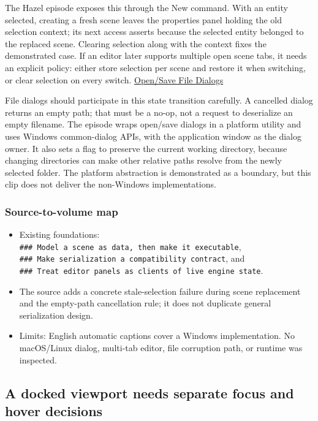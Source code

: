 The Hazel episode exposes this through the New command. With an entity selected, creating a fresh scene leaves the properties panel holding the old selection context; its next access asserts because the selected entity belonged to the replaced scene. Clearing selection along with the context fixes the demonstrated case. If an editor later supports multiple open scene tabs, it needs an explicit policy: either store selection per scene and restore it when switching, or clear selection on every switch. \href{https://www.youtube.com/watch?v=zn7N7zHgCcs}{Open/Save File Dialogs}

File dialogs should participate in this state transition carefully. A cancelled dialog returns an empty path; that must be a no-op, not a request to deserialize an empty filename. The episode wraps open/save dialogs in a platform utility and uses Windows common-dialog APIs, with the application window as the dialog owner. It also sets a flag to preserve the current working directory, because changing directories can make other relative paths resolve from the newly selected folder. The platform abstraction is demonstrated as a boundary, but this clip does not deliver the non-Windows implementations.

\subsubsection{Source-to-volume map}\label{06-engine-ii-ch032-source-to-volume-map-1}

\hypertarget{06-engine-ii-ch032-source-to-volume-map-1}{}

\begin{itemize}
\tightlist
\item
  Existing foundations: \texttt{\#\#\#\ Model\ a\ scene\ as\ data,\ then\ make\ it\ executable}, \texttt{\#\#\#\ Make\ serialization\ a\ compatibility\ contract}, and \texttt{\#\#\#\ Treat\ editor\ panels\ as\ clients\ of\ live\ engine\ state}.
\item
  The source adds a concrete stale-selection failure during scene replacement and the empty-path cancellation rule; it does not duplicate general serialization design.
\item
  Limits: English automatic captions cover a Windows implementation. No macOS/Linux dialog, multi-tab editor, file corruption path, or runtime was inspected.
\end{itemize}

\subsection{A docked viewport needs separate focus and hover decisions}\label{06-engine-ii-ch032-a-docked-viewport-needs-separate-focus-and-hover-decisions}

